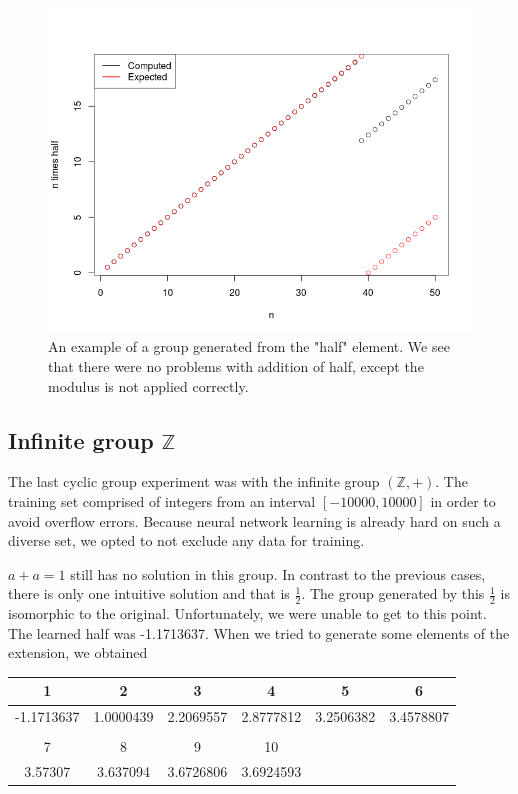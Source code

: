 \begin{figure}[h]
\centering
\caption{An example of a group generated from the "half" element. We see that there were no problems with addition of half, except the modulus is not applied correctly.}
\label{graph:z20_half_generator}
\includegraphics[width=0.8\linewidth]{../img/z20_half_plot.png}
\end{figure}

\subsection{Infinite group $\mathbb{Z}$}

The last cyclic group experiment was with the infinite group $(\mathbb{Z},+)$. The training set comprised of integers from an interval $[-10000,10000]$ in order to avoid overflow errors. Because neural network learning is already hard on such a diverse set, we opted to not exclude any data for training. 

$a+a=1$ still has no solution in this group. In contrast to the previous cases, there is only one intuitive solution and that is $\frac{1}{2}$. The group generated by this $\frac{1}{2}$ is isomorphic to the original. Unfortunately, we were unable to get to this point. The learned half was 
-1.1713637. When we tried to generate some elements of the extension, we obtained

\begin{tabular}{cccccc}
1&2&3&4&5&6\\
\hline
-1.1713637&1.0000439&2.2069557&2.8777812&3.2506382&3.4578807\\
 \\
7&8&9&10\\
\hline 
3.57307&3.637094&3.6726806&3.6924593
\end{tabular}

